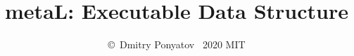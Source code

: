 

\author{\copyright\ Dmitry Ponyatov \ 2020 MIT}
\title{metaL: Executable Data Structure}





\renewcommand{\contentsname}{}
\tableofcontents \secdown
\listoflistings





